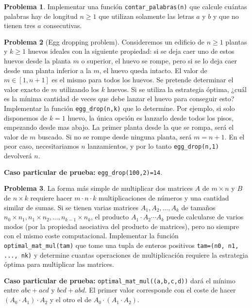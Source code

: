 \documentclass[a4paper, 11pt]{article}
\newcounter{numerodetema}
\theoremstyle{plain}
\theoremstyle{definition}
\newtheorem{prob}{Problema}[numerodetema]
\begin{document}
\begin{prob}
Implementar una función \texttt{contar\_palabras(n)}
que calcule cuántas palabras hay de longitud $n\geq 1$ que utilizan
solamente las letras $a$ y $b$ y que no tienen tres $a$ consecutivas.
\end{prob}

\begin{prob}[Egg dropping problem]
Consideremos un edificio de $n\geq 1$ plantas y $k\geq 1$ huevos ideales con
la siguiente propiedad: si se deja caer uno de estos huevos desde la planta $m$
o superior, el huevo se rompe, pero si se lo deja caer desde una planta inferior
a la $m$, el huevo queda intacto. El valor de $m\in[1,n+1]$ es el mismo para
todos los huevos. Se pretende determinar el valor exacto de $m$ utilizando los
$k$ huevos. Si se utiliza la estrategia óptima, ¿cuál es la mínima cantidad de
veces que debe lanzar el huevo para conseguir esto? Implementar la función
\texttt{egg\_drop(n,k)} que lo determine. Por ejemplo, si solo disponemos de
$k=1$ huevo, la única opción es lanzarlo desde todos los pisos, empezando desde
mas abajo. La primer planta desde la que se rompa, será el valor de $m$ buscado.
Si no se rompe desde ninguna planta, será $m=n+1$. En el peor caso,
necesitariamos $n$ lanzamientos, y por lo tanto \texttt{egg\_drop(n,1)} devolverá
$n$.

\smallskip

{\bf Caso particular de prueba:} \texttt{egg\_drop(100,2)=14}.
\end{prob}

\begin{prob}
La forma más simple de multiplicar dos matrices $A$ de $m\times n$ y $B$ de
$n\times k$ requiere hacer $m\cdot n\cdot k$ multiplicaciones de números
y una cantidad similar de sumas. Si se tienen varias matrices $A_1,A_2,\ldots,A_k$
de tamaños $n_0\times n_1, n_1\times n_2,\ldots,n_{k-1}\times n_k$, el producto
$A_1\cdot A_2\cdots A_k$ puede calcularse de varios modos (por la propiedad asociativa
del producto de matrices), pero no siempre con el mismo coste computacional. Implementar
la función \texttt{optimal\_mat\_mul(tam)} que tome una tupla de enteros positivos
\texttt{tam=(n0, n1, ..., nk)} y determine cuantas operaciones de multiplicación requiere
la estrategia óptima para multiplicar las matrices.

\smallskip

{\bf Caso particular de prueba:} \texttt{optimal\_mat\_mul((a,b,c,d))} dará el
mínimo entre $abc+acd$ y $bcd+abd$. El primer valor corresponde con el coste
de hacer $(A_0\cdot A_1)\cdot A_2$ y el otro el de $A_0\cdot (A_1\cdot A_2)$.
\end{prob}
\end{document}
